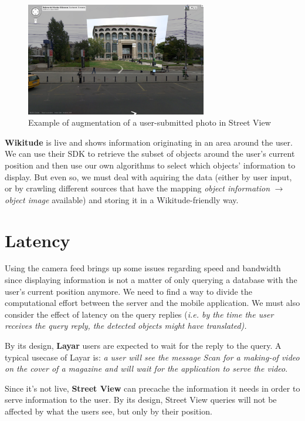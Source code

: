 \documentclass[a4paper,onecolumn,oneside,titlepage,11pt]{report}
\begin{document}
\begin{figure}[H]
\begin{center}
\includegraphics[width=7.9cm]{images/streetview_augmentation.png}
\caption{Example of augmentation of a user-submitted photo in Street View}
\end{center}
\end{figure}

\textbf{Wikitude} is live and shows information originating in an area around the user. We can use their SDK to retrieve the subset of objects around the user's current position and then use our own algorithms to select which objects' information to display. But even so, we must deal with aquiring the data (either by user input, or by crawling different sources that have the mapping \emph{object information} $\rightarrow$ \emph{object image} available) and storing it in a Wikitude-friendly way.
\section*{Latency}
Using the camera feed brings up some issues regarding speed and bandwidth since displaying information is not a matter of only querying a database with the user's current position anymore. We need to find a way to divide the computational effort between the server and the mobile application. We must also consider the effect of latency on the query replies (\emph{i.e. by the time the user receives the query reply, the detected objects might have translated).}

By its design, \textbf{Layar} users are expected to wait for the reply to the query. A typical usecase of Layar is: \emph{a user will see the message \emph{Scan for a making-of video} on the cover of a magazine and will wait for the application to serve the video}.

Since it's not live, \textbf{Street View} can precache the information it needs in order to serve information to the user. By its design, Street View queries will not be affected by what the users see, but only by their position.
\end{document}
